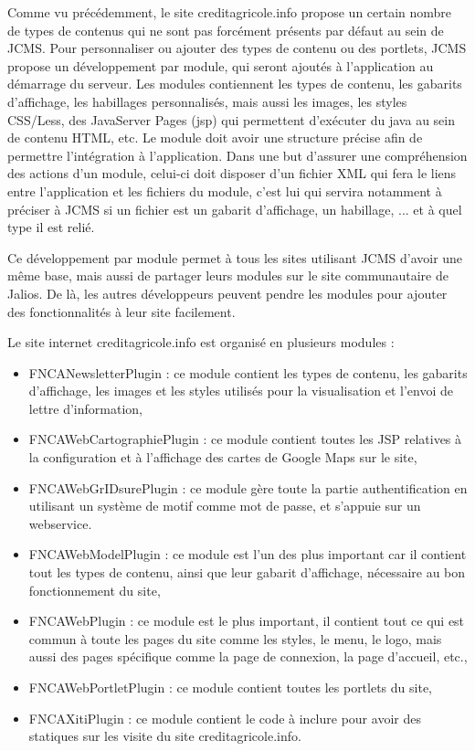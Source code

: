 \documentclass[12pt,a4paper]{article}
\begin{document}
\medskip
Comme vu précédemment, le site creditagricole.info propose un certain nombre de types de contenus qui ne sont pas forcément présents par défaut au sein de \gls{JCMS}. Pour personnaliser ou ajouter des types de contenu ou des portlets, \gls{JCMS} propose un développement par module, qui seront ajoutés à l'application au démarrage du serveur. Les modules contiennent les types de contenu, les gabarits d'affichage, les habillages personnalisés, mais aussi les images, les styles CSS/Less, des JavaServer Pages (jsp) qui permettent d'exécuter du java au sein de contenu HTML, etc. Le module doit avoir une structure précise afin de permettre l'intégration à l'application. Dans une but d'assurer une compréhension des actions d'un module, celui-ci doit disposer d'un fichier XML qui fera le liens entre l'application et les fichiers du module, c'est lui qui servira notamment à préciser à \gls{JCMS} si un fichier est un gabarit d'affichage, un habillage, ... et à quel type il est relié.\par 
Ce développement par module permet à tous les sites utilisant \gls{JCMS} d'avoir une même base, mais aussi de partager leurs modules sur le site communautaire de Jalios. De là, les autres développeurs peuvent pendre les modules pour ajouter des fonctionnalités à leur site facilement.\par 
Le site internet creditagricole.info est organisé en plusieurs modules :
\begin{itemize}
\item FNCANewsletterPlugin : ce module contient les types de contenu, les gabarits d'affichage, les images et les styles utilisés pour la visualisation et l'envoi de lettre d'information,
\item FNCAWebCartographiePlugin : ce module contient toutes les JSP relatives à la configuration et à l'affichage des cartes de Google Maps sur le site,
\item FNCAWebGrIDsurePlugin : ce module gère toute la partie authentification en utilisant un système de motif comme mot de passe, et s'appuie sur un webservice.
\item FNCAWebModelPlugin : ce module est l'un des plus important car il contient tout les types de contenu, ainsi que leur gabarit d'affichage, nécessaire au bon fonctionnement du site,
\item FNCAWebPlugin : ce module est le plus important, il contient tout ce qui est commun à toute les pages du site comme les styles, le menu, le logo, mais aussi des pages spécifique comme la page de connexion, la page d'accueil, etc.,
\item FNCAWebPortletPlugin : ce module contient toutes les portlets du site,
\item FNCAXitiPlugin : ce module contient le code à inclure pour avoir des statiques sur les visite du site creditagricole.info.
\end{itemize}\par
\end{document}
